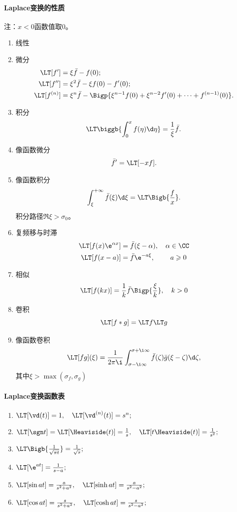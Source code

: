 \paragraph{Laplace变换的性质}注：$x<0$函数值取0。
\begin{enumerate}
	\item 线性
	\item 微分
	\begin{align*}
		\LT[f']&=\xi\bar f-f(0);\\
		\LT[f'']&=\xi^2\bar f-\xi f(0)-f'(0);\\
		\LT[f^{(n)}]&=\xi^n\bar f-\Bigp{\xi^{n-1}f(0)+\xi^{n-2}f'(0)+\cdots+f^{(n-1)}(0)}.
	\end{align*}
	\item 积分 
	\[
		\LT\biggb{\int_0^xf(\eta)\d\eta}=\frac1\xi\bar f.
	\]
	\item 像函数微分
	\[
		\bar f'=\LT[-xf].
	\]
	\item 像函数积分
	\[
		\int_\xi^{+\infty}\bar f(\xi)\d\xi=\LT\Bigb{\frac fx}.
	\]
	积分路径$\Re\xi>\sigma_0$。
	\item 复频移与时滞
	\begin{align*}
		\LT[f(x)\e^{\alpha x}]&=\bar f(\xi-\alpha),\quad \alpha\in\CC\\
		\LT[f(x-a)]&=\bar f\e^{-a\xi},\qquad\; a\geqslant 0 %
	\end{align*}
	\item 相似
	\[
		\LT[f(kx)]=\frac1k\bar f\Bigp{\frac\xi{k}},\quad k>0
	\]
	\item 卷积
	\[
		\LT[f\ast g]=\LT f\LT g
		\]
	\item 像函数卷积
	\[
		\LT[fg](\xi)=\frac1{2\pi\i}\int_{\sigma-\i\infty}^{\sigma+\i\infty}\bar f(\zeta)\bar g(\xi-\zeta)\d\zeta,
		\]
	其中$\xi>\max(\sigma_f,\sigma_g)$
\end{enumerate}
\paragraph{Laplace变换函数表}
\begin{enumerate}
	\item $\LT[\vd(t)] = 1,\quad \LT[\vd^{(n)}(t)] = s^n;$
	\item $\LT[\sgn t]=\LT[\Heaviside(t)]=\frac1s,\quad \LT[t\Heaviside(t)]=\frac1{s^2};$
	\item $\LT\Bigb{\frac1{\sqrt{\pi t}}}=\frac1{\sqrt s};$%
	\item $\LT[\e^{at}]=\frac1{s-a};$
	\item $\LT[\sin at]=\frac a{s^2+a^2},\quad \LT[\sinh at]=\frac a{s^2-a^2};$
	\item $\LT[\cos at]=\frac s{s^2+a^2},\quad \LT[\cosh at]=\frac s{s^2-a^2};$
\end{enumerate}

